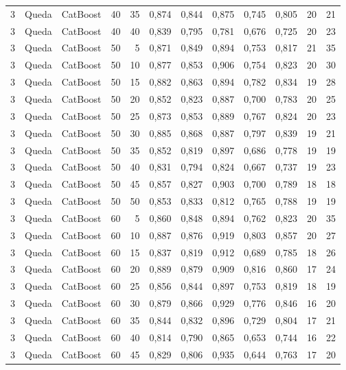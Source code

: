 \begin{longtable}{ccclrrrrrrrr}
3 & Queda & CatBoost & 40 & 35 & 0,874 & 0,844 & 0,875 & 0,745 & 0,805 & 20 & 21 \\
3 & Queda & CatBoost & 40 & 40 & 0,839 & 0,795 & 0,781 & 0,676 & 0,725 & 20 & 23 \\
3 & Queda & CatBoost & 50 & 5 & 0,871 & 0,849 & 0,894 & 0,753 & 0,817 & 21 & 35 \\
3 & Queda & CatBoost & 50 & 10 & 0,877 & 0,853 & 0,906 & 0,754 & 0,823 & 20 & 30 \\
3 & Queda & CatBoost & 50 & 15 & 0,882 & 0,863 & 0,894 & 0,782 & 0,834 & 19 & 28 \\
3 & Queda & CatBoost & 50 & 20 & 0,852 & 0,823 & 0,887 & 0,700 & 0,783 & 20 & 25 \\
3 & Queda & CatBoost & 50 & 25 & 0,873 & 0,853 & 0,889 & 0,767 & 0,824 & 20 & 23 \\
3 & Queda & CatBoost & 50 & 30 & 0,885 & 0,868 & 0,887 & 0,797 & 0,839 & 19 & 21 \\
3 & Queda & CatBoost & 50 & 35 & 0,852 & 0,819 & 0,897 & 0,686 & 0,778 & 19 & 19 \\
3 & Queda & CatBoost & 50 & 40 & 0,831 & 0,794 & 0,824 & 0,667 & 0,737 & 19 & 23 \\
3 & Queda & CatBoost & 50 & 45 & 0,857 & 0,827 & 0,903 & 0,700 & 0,789 & 18 & 18 \\
3 & Queda & CatBoost & 50 & 50 & 0,853 & 0,833 & 0,812 & 0,765 & 0,788 & 19 & 19 \\
3 & Queda & CatBoost & 60 & 5 & 0,860 & 0,848 & 0,894 & 0,762 & 0,823 & 20 & 35 \\
3 & Queda & CatBoost & 60 & 10 & 0,887 & 0,876 & 0,919 & 0,803 & 0,857 & 20 & 27 \\
3 & Queda & CatBoost & 60 & 15 & 0,837 & 0,819 & 0,912 & 0,689 & 0,785 & 18 & 26 \\
3 & Queda & CatBoost & 60 & 20 & 0,889 & 0,879 & 0,909 & 0,816 & 0,860 & 17 & 24 \\
3 & Queda & CatBoost & 60 & 25 & 0,856 & 0,844 & 0,897 & 0,753 & 0,819 & 18 & 19 \\
3 & Queda & CatBoost & 60 & 30 & 0,879 & 0,866 & 0,929 & 0,776 & 0,846 & 16 & 20 \\
3 & Queda & CatBoost & 60 & 35 & 0,844 & 0,832 & 0,896 & 0,729 & 0,804 & 17 & 21 \\
3 & Queda & CatBoost & 60 & 40 & 0,814 & 0,790 & 0,865 & 0,653 & 0,744 & 16 & 22 \\
3 & Queda & CatBoost & 60 & 45 & 0,829 & 0,806 & 0,935 & 0,644 & 0,763 & 17 & 20 \\

\end{longtable}
